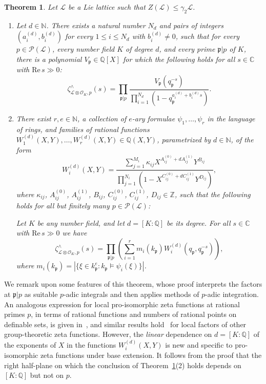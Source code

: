 \documentclass[11pt,a4paper]{amsart}
\theoremstyle{plain}
\newtheorem{thm}{Theorem}[section]
\theoremstyle{remark}
\newcommand{\N}{\mathbb{N}}
\newcommand{\Z}{\mathbb{Z}}
\newcommand{\Q}{\mathbb{Q}}
\newcommand{\C}{\mathbb{C}}
\newcommand{\tensor}{\otimes}
\newcommand{\p}{\mathfrak{p}}
\newcommand{\unifmax}{r}
\def \p {\ensuremath{\mathfrak{p}}}
\begin{document}
\begin{thm} \label{thm:uniformity}
Let $\mathcal{L}$ be a Lie lattice such that $Z(\mathcal{L}) \leq \gamma_2 \mathcal{L}$.
\begin{enumerate}
\item
Let $d \in \N$.  There exists a natural number $N_d$ and pairs of integers $(a_i^{(d)}, b_i^{(d)})$ for every $1 \leq i \leq N_d$ with $b_i^{(d)} \neq 0$, such that for every $p \in \mathcal{P}(\mathcal{L})$,
every number field $K$ of degree $d$, and every prime $\p | p$ of $K$, there is a polynomial $V_\p \in \Q[X]$ for which the following holds for all $s \in \C$ with $\mathrm{Re} \, s \gg 0$:
$$ \zeta^\wedge_{\mathcal{L} \tensor \mathcal{O}_K, p}(s) = \prod_{\p | p} \frac{V_\p (q_\p^{-s})}{\prod_{i = 1}^{N_d} (1 - q_\p^{a_i^{(d)} + b_i^{(d)} s})}.$$
\item
There exist $\unifmax, e \in \N$, a collection of $e$-ary formulae $\psi_{1}, \dots, \psi_{\unifmax}$ in the language of rings, and families of rational functions $W_1^{(d)}(X,Y), \dots, W_{\unifmax}^{(d)}(X,Y) \in \Q(X,Y)$, parametrized by $d \in \N$, of the form
\begin{equation*} \label{equ:general.form}
W_{i}^{(d)}(X,Y) = \frac{ \sum_{j = 1}^{M_i} \kappa_{ij} X^{A_{ij}^{(0)} + dA_{ij}^{(1)}} Y^{B_{ij}} }{\prod_{j = 1}^{N_i} (1 - X^{C_{ij}^{(0)} + dC_{ij}^{(1)}} Y^{D_{ij}})},
\end{equation*}
where $\kappa_{ij}$, $A_{ij}^{(0)}$, $A_{ij}^{(1)}$, $B_{ij}$, $C_{ij}^{(0)}$, $C_{ij}^{(1)}$, $D_{ij} \in \Z$, such that the following holds for all but finitely many $p \in \mathcal{P}(\mathcal{L})$:

Let $K$ be any number field, and let $d = [K:\Q]$ be its degree.  For all $s \in \C$ with $\mathrm{Re} \, s \gg 0$ we have
$$\zeta^\wedge_{\mathcal{L} \tensor \mathcal{O}_K, p}(s) = \prod_{\p | p} \left( \sum_{i = 1}^{\unifmax} m_i (k_\p) W_i^{(d)}(q_\p, q_\p^{-s}) \right),$$
where $m_i (k_\p) = | \{ \xi \in k_\p^{e} : k_\p \models \psi_i(\xi) \} |$.  
\end{enumerate}
\end{thm}


We remark upon some features of this theorem, whose proof interprets the factors at $\p | p$ as suitable $p$-adic integrals and then applies methods of $p$-adic integration.
An analogous expression for local pro-isomorphic zeta functions at rational primes $p$, in terms of rational functions and numbers of rational points on definable sets, is given in~\cite[Theorem~7.2]{HMR/18}, and similar results hold~\cite{duSG/00, HMR/18} for local factors of other group-theoretic zeta functions.  However, the \emph{linear} dependence on $d = [K:\Q]$ of the exponents of $X$ in the functions $W_i^{(d)}(X,Y)$ is new and specific to pro-isomorphic zeta functions under base extension.  It follows from the proof that the right half-plane on which the conclusion of Theorem~\ref{thm:uniformity}(2) holds depends on $[K:\Q]$ but not on $p$.
\end{document}
